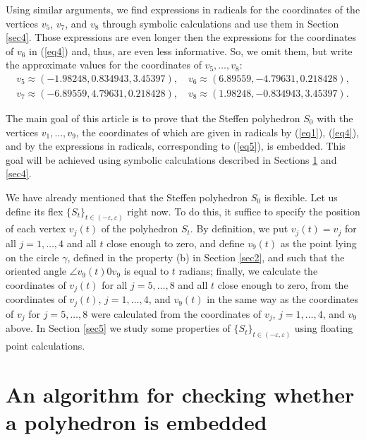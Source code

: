 \documentclass[12pt, reqno]{amsart}
\begin{document}
Using similar arguments, we find expressions in radicals for the coordinates of 
the vertices 
$v_5$, $v_7$, 
and 
$v_8$
through symbolic calculations and use them in Section \ref{sec4}.
Those expressions are even longer then the expressions for the coordinates of 
$v_6$ 
in (\ref{eq4}) and, thus, are even less informative.
So, we omit them, but write the approximate values for the coordinates of 
$v_5, \dots, v_8$: 
\begin{equation}\label{eq5}
\begin{split}
v_5 \approx (-1.98248, 0.834943, 3.45397),\quad
v_6 \approx (6.89559, -4.79631, 0.218428), \\
v_7 \approx (-6.89559, 4.79631, 0.218428),\quad  
v_8 \approx (1.98248, -0.834943, 3.45397). 
\end{split}
\end{equation}

The main goal of this article is to prove that the Steffen polyhedron 
$S_0$
with the vertices 
$v_1, \dots, v_9$, 
the coordinates of which are given in radicals by (\ref{eq1}), (\ref{eq4}),
and by the expressions in radicals, corresponding to (\ref{eq5}), is embedded.
This goal will be achieved using symbolic calculations described in Sections
\ref{sec3} and \ref{sec4}.

We have already mentioned that the Steffen polyhedron 
$S_0$
is flexible.
Let us define its flex 
$\{S_t \}_{t\in(-\varepsilon,\varepsilon)}$ 
right now.
To do this, it suffice to specify the position of each vertex
$v_j(t)$
of the polyhedron
$S_t$.
By definition, we put
$v_j(t)=v_j$
for all
$j=1,\dots,4$
and all $t$ close enough to zero, and define 
$v_9(t)$ 
as the point lying on the circle
$\gamma$,
defined in the property (b) in Section \ref{sec2}, and such that the oriented angle 
$\angle v_9(t)0v_9$
is equal to
$t$ 
radians; finally, we calculate the coordinates of  
$v_j(t)$ 
for all
$j=5,\dots,8$ 
and all 
$t$ 
close enough to zero, from the coordinates of  
$v_j(t)$, $j=1,\dots,4$, 
and
$v_9(t)$ 
in the same way as the coordinates of  
$v_j$ for $j=5,\dots,8$
were calculated from the coordinates of  
$v_j$, $j=1,\dots,4$, 
and
$v_9$ 
above.
In Section \ref{sec5} we study some properties of 
$\{S_t \}_{t\in(-\varepsilon,\varepsilon)}$
using floating point calculations. 

\section{An algorithm for checking whether a polyhedron is embedded}\label{sec3} 
\end{document}
